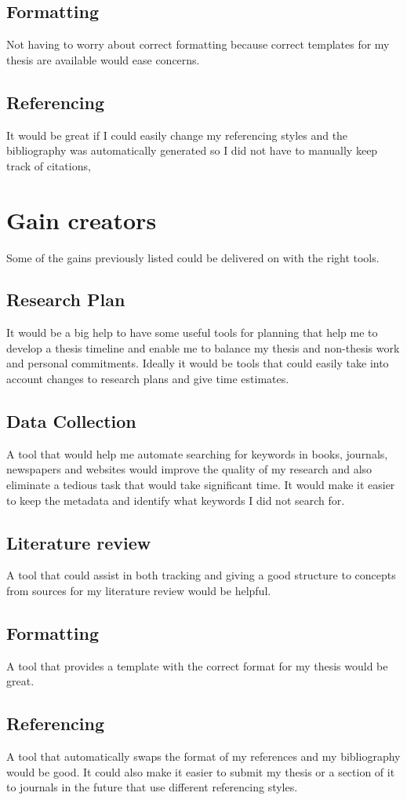 \documentclass{article}
\begin{document}
\subsection*{Formatting}

Not having to worry about correct formatting because correct templates for my thesis are available would ease concerns.

\subsection*{Referencing}

It would be great if I could easily change my referencing styles and the bibliography was automatically generated so I did not have to manually keep track of citations,

\section*{Gain creators}
Some of the gains previously listed could be delivered on with the right tools.
\subsection*{Research Plan}
It would be a big help to have some useful tools for planning that help me to develop a thesis timeline and enable me to balance my thesis and non-thesis work and personal commitments. Ideally it would be tools that could easily take into account changes to research plans and give time estimates. \par

\subsection*{Data Collection}

A tool that would help me automate searching for keywords in books, journals, newspapers and websites would improve the quality of my research and also eliminate a tedious task that would take significant time. It would make it easier to keep the metadata and identify what keywords I did not search for.

\subsection*{Literature review}
A tool that could assist in both tracking and giving a good structure to concepts from sources for my literature review would be helpful.

\subsection*{Formatting}
A tool that provides a template with the correct format for my thesis would be great.

\subsection*{Referencing}

A tool that automatically swaps the format of my references and my bibliography would be good. It could also make it easier to submit my thesis or a section of it to journals in the future that use different referencing styles.
\end{document}
